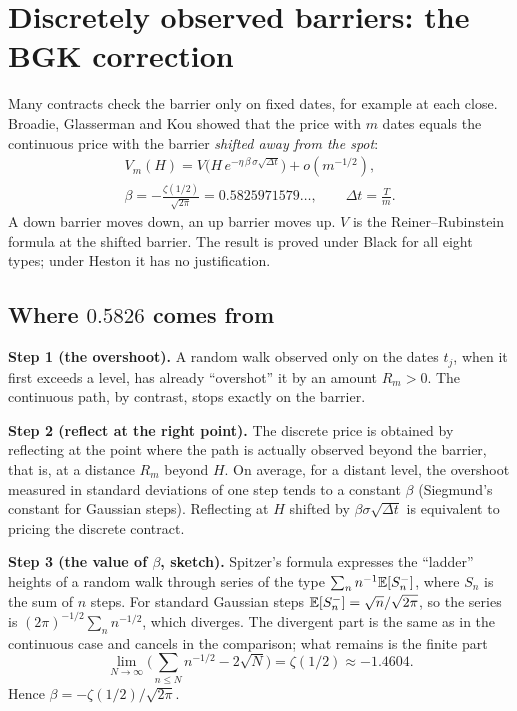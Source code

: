 \section{Discretely observed barriers: the BGK correction}
Many contracts check the barrier only on fixed dates, for example at each close. Broadie, Glasserman and Kou showed
that the price with $m$ dates equals the continuous price with the barrier \emph{shifted away from the spot}:
\begin{equation}\label{eq:bgk}
\begin{gathered}
V_m(H)=V\big(H\,e^{-\eta\,\beta\,\sigma\sqrt{\Delta t}}\big)+o(m^{-1/2}),\\
\beta=-\frac{\zeta(1/2)}{\sqrt{2\pi}}=0.5825971579\ldots,\qquad\Delta t=\frac Tm .
\end{gathered}
\end{equation}
A down barrier moves down, an up barrier moves up. $V$ is the Reiner--Rubinstein formula at the shifted barrier. The
result is proved under Black for all eight types; under Heston it has no justification.

\subsection{\texorpdfstring{Where $0.5826$ comes from}{Where 0.5826 comes from}}
\noindent\textbf{Step 1 (the overshoot).} A random walk observed only on the dates $t_j$, when it first exceeds a
level, has already ``overshot'' it by an amount $R_m>0$. The continuous path, by contrast, stops exactly on the
barrier.

\noindent\textbf{Step 2 (reflect at the right point).} The discrete price is obtained by reflecting at the point
where the path is actually observed beyond the barrier, that is, at a distance $R_m$ beyond $H$. On average, for a
distant level, the overshoot measured in standard deviations of one step tends to a constant $\beta$ (Siegmund's
constant for Gaussian steps). Reflecting at $H$ shifted by $\beta\sigma\sqrt{\Delta t}$ is equivalent to pricing the
discrete contract.

\noindent\textbf{Step 3 (the value of $\beta$, sketch).} Spitzer's formula expresses the ``ladder'' heights of a
random walk through series of the type $\sum_n n^{-1}\mathbb{E}[S_n^-]$, where $S_n$ is the sum of $n$ steps. For standard
Gaussian steps $\mathbb{E}[S_n^-]=\sqrt n/\sqrt{2\pi}$, so the series is $(2\pi)^{-1/2}\sum_n n^{-1/2}$, which diverges. The
divergent part is the same as in the continuous case and cancels in the comparison; what remains is the finite part
\[
\lim_{N\to\infty}\Big(\sum_{n\le N}n^{-1/2}-2\sqrt N\Big)=\zeta(1/2)\approx-1.4604 .
\]
Hence $\beta=-\zeta(1/2)/\sqrt{2\pi}$.

